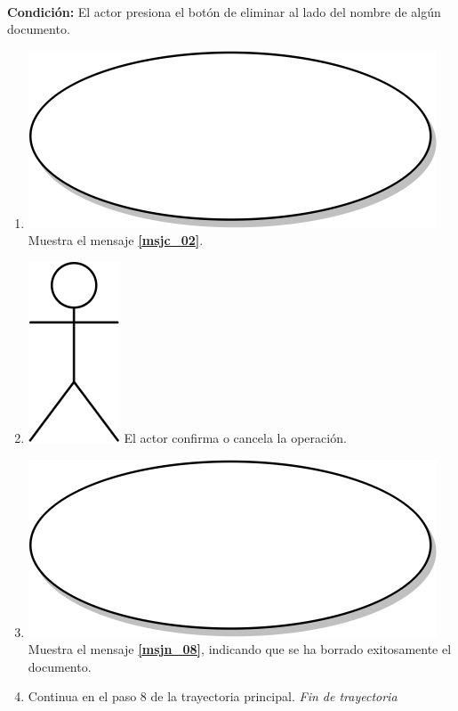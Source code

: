 \textbf{} \\
\textbf{Condición:} El actor presiona el botón de eliminar al lado del nombre de algún documento.\\
 \begin{enumerate}[label=A\arabic*]
    \item {\includegraphics[scale=.05]{Capitulo3/img/proceso.png} Muestra el mensaje \textbf{\ref{msjc_02}}.}
    \item {\includegraphics[scale=.1]{Capitulo3/img/actor.png} El actor confirma o cancela la operación.}
        \item {\includegraphics[scale=.05]{Capitulo3/img/proceso.png} Muestra el mensaje \textbf{\ref{msjn_08}}, indicando que se ha borrado exitosamente el documento.}
    \item {Continua en el paso 8  de la trayectoria principal.}
    \textit{Fin de trayectoria} \\
\end{enumerate}

